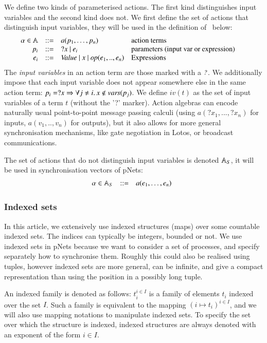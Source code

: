 \documentclass{elsarticle}
\begin{document}
We define two kinds of parameterised actions. The first kind distinguishes input variables and the second kind does not. 
We first define the set of actions that distinguish input variables, they will be used in the definition of \pLTS\ below:
\[
\begin{array}[l]{rcl@{\quad}p{5.65cm}}
  \alpha\in\AlgA&::=&a(p_1,\ldots,p_n)&\text{action terms}\\
  p_i&::=& ?x~|~e_i&\text{parameters (input var or expression)}\\
  e_i&::=& \symb{Value}~|~x~|~\symb{op}(\symb{e}_1,..,\symb{e}_n)&\text{Expressions}
\end{array}
\]
The \emph{input variables} in an action term are those marked with a
$\symb{?}$.
We additionally impose that each input variable does not
appear somewhere else in the same action term:
$p_i=?x\Rightarrow\forall j\neq i.\, x\notin \vars(p_j)$.
We define $iv(t)$  as the set of input variables of a term $t$ (without the '?' marker).
Action algebras can encode naturally usual point-to-point message passing calculi (using 
$a(?x_1,...,?x_n)$ for inputs, $a(v_1,..,v_n)$ for outputs), but it also allows
for more general synchronisation mechanisms, like gate negotiation in Lotos, or broadcast
communications. 

The set of actions that do not distinguish input variables is denoted $\mathbb{A}_S$, it will be used in synchronisation vectors of pNets:
\[\begin{array}[l]{rcl@{\quad}l}
  \alpha\in \AlgAS &::=&a(e_1,\ldots,e_n)
\end{array}
\]






\subsubsection*{Indexed sets}



In this article, we extensively use indexed structures 
(maps) over some countable indexed sets.   The indices can typically be
integers, bounded or not. We use indexed sets in pNets because we want to consider a set of processes, and specify separately how to synchronise them. Roughly this could also be realised using tuples, however indexed sets are more general, can be infinite, and give a compact representation than using the position in a possibly long tuple.

An indexed family is denoted as
follows: $t_i^{i\in I}$ is a family of elements $t_i$ indexed over the
set $I$. Such a family
is equivalent to the mapping $(i\mapsto t_i)^{i\in I}$, and we will also use mapping 
notations to manipulate indexed sets.
To specify the set over which the structure is indexed, 
indexed structures are always denoted with an exponent of the form $i\in I$.
\end{document}
